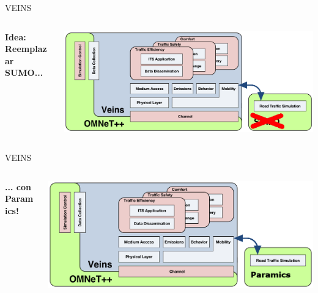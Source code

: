 \documentclass[aspectratio=169]{beamer}
\begin{document}
\begin{frame}{VEINS}
\begin{columns}
    \begin{column}{.3\linewidth}
        \centering
        \textbf{Idea: Reemplazar SUMO...}
    \end{column}
    \begin{column}{.7\linewidth}
        \centering
        \includegraphics[width=\linewidth]{figuras/veins-arch-nosumo.png}
    \end{column}
\end{columns}
\end{frame}

\begin{frame}{VEINS}
\begin{columns}
    \begin{column}{.3\linewidth}
        \centering
        \textbf{... con Paramics!}
    \end{column}
    \begin{column}{.7\linewidth}
        \centering
        \includegraphics[width=\linewidth]{figuras/veins-arch-paramics.png}
    \end{column}
\end{columns}
\end{frame}
\end{document}
